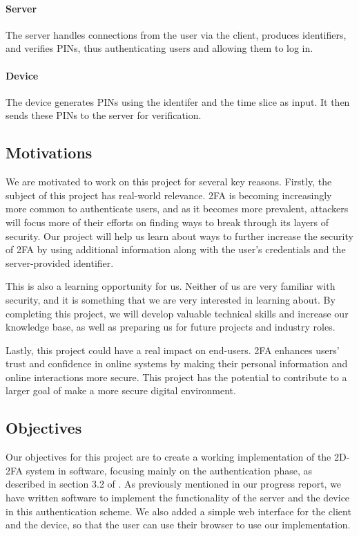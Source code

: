 \documentclass[11pt]{article}
\begin{document}
\paragraph{Server} The server handles connections from the user via the
client, produces identifiers, and verifies PINs, thus authenticating
users and allowing them to log in.

\paragraph{Device} The device generates PINs using the identifer and the
time slice as input. It then sends these PINs to the server for
verification. 

\subsection{Motivations}

We are motivated to work on this project for several key reasons.
Firstly, the subject of this project has real-world relevance. 2FA is
becoming increasingly more common to authenticate users, and as it
becomes more prevalent, attackers will focus more of their efforts on
finding ways to break through its layers of security. Our project will
help us learn about ways to further increase the security of 2FA by
using additional information along with the user's credentials and the
server-provided identifier.

This is also a learning opportunity for us. Neither of us are very
familiar with security, and it is something that we are very interested
in learning about. By completing this project, we will develop valuable
technical skills and increase our knowledge base, as well as preparing
us for future projects and industry roles.

Lastly, this project could have a real impact on end-users. 2FA enhances
users' trust and confidence in online systems by making their personal
information and online interactions more secure. This project has the
potential to contribute to a larger goal of make a more secure digital
environment. 

\subsection{Objectives}

Our objectives for this project are to create a working implementation
of the 2D-2FA system in software, focusing mainly on the authentication
phase, as described in section 3.2 of \cite{shirvanian2d2fa}. As
previously mentioned in our progress report, we have written software to
implement the functionality of the server and the device in this
authentication scheme. We also added a simple web interface for the
client and the device, so that the user can use their browser to use our
implementation. 
\end{document}
